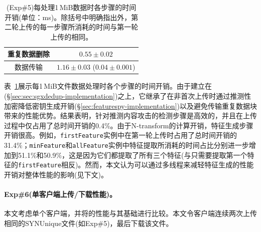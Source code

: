 \begin{table}[!htb]
{\begin{tabular}{|c|c|c|c|c|}
            \multicolumn{2}{|c|}{重复数据删除}                 &
            \multicolumn{3}{c|}{$0.55 \pm 0.02$}                                                                                                            \\ \hline
            \multicolumn{2}{|c|}{数据传输}                     & \multicolumn{3}{c|}{$1.16 \pm 0.03$ ($0.04 \pm 0.001$)}                                    \\ \hline
        \end{tabular}
    }
    \caption{(Exp\#5)每处理1\,MiB数据时各步骤的时间开销(单位：ms)。除括号中明确指出外，第二轮上传的每一步骤所消耗的时间与第一轮上传的相同。}
    \label{tab:featurespy-evaluation-syn-system-breakdown}
\end{table}

表~\ref{tab:featurespy-evaluation-syn-system-breakdown}展示每1\,MiB文件数据处理时各个步骤的时间开销。由于\prototype 建立在\sysnameS(\S\ref{sec:sec:sgxdedup-implementation})之上，它继承了在非首次上传时通过推测性加密降低密钥生成开销(\S\ref{sec:featurespy-implementation})以及避免传输重复数据块带来的性能优势。结果表明，针对推测内容攻击的检测步骤是高效的，并且在上传过程中仅占用了总时间开销的0.4\%。由于N-transform的计算开销，特征生成步骤开销很高。例如，{\tt firstFeature}实例中在第一轮上传时占用了总时间开销的31.4\%；{\tt minFeature}和{\tt allFeature}实例中特征提取所消耗的时间占比分别进一步增加到51.1\%和50.9\%，这是因为它们都提取了所有三个特征(与只需要提取第一个特征的{\tt firstFeature}相反)。然而，本文认为可以通过多线程来减轻特征生成的性能开销对\prototype 整体性能的影响(见下文)。

\paragraph*{Exp\#6(单客户端上传/下载性能)。}
本文考虑单个客户端，并将\prototype 的性能与其基础\sysnameS 进行比较。本文令客户端连续两次上传相同的SYNUnique文件(如Exp\#5)，最后下载该文件。

